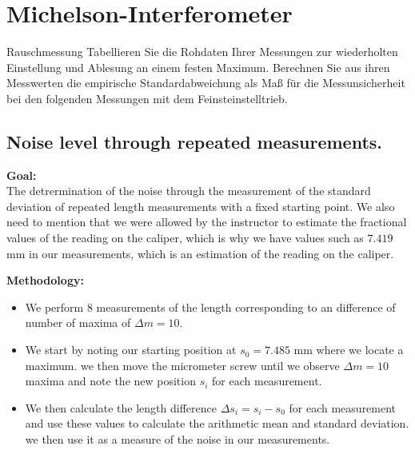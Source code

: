 \section{Michelson-Interferometer}

\begin{aufgabe}{Rauschmessung}
  Tabellieren Sie die Rohdaten Ihrer Messungen zur wiederholten
  Einstellung und Ablesung an einem festen Maximum. Berechnen Sie aus
  ihren Messwerten die empirische Standardabweichung als Maß für die
  Messunsicherheit bei den folgenden Messungen mit dem
  Feinsteinstelltrieb.
\end{aufgabe}



\subsection{Noise level through repeated measurements.}
\textbf{Goal:} \\
The detrermination of the noise through the measurement of the standard deviation of repeated length measurements with a fixed starting point. We also need to mention that we were allowed by the instructor to estimate the fractional values of the reading on the caliper, which is why we have values such as $7.419$ mm in our measurements, which is an estimation of the reading on the caliper.
\vspace{1em}


\textbf{Methodology:}
\begin{itemize}
    \item We perform 8 measurements of the length corresponding to an difference of number of maxima of $\Delta m=10$.
    \item We start by noting our starting position at $s_0 = 7.485$ mm where we locate a maximum. we then move the micrometer screw until we observe $\Delta m = 10$ maxima and note the new position $s_i$ for each measurement.
    \item We then calculate the length difference $\Delta s_i = s_i - s_0$ for each measurement and use these values to calculate the arithmetic mean and standard deviation. we then use it as a measure of the noise in our measurements.
\end{itemize}

